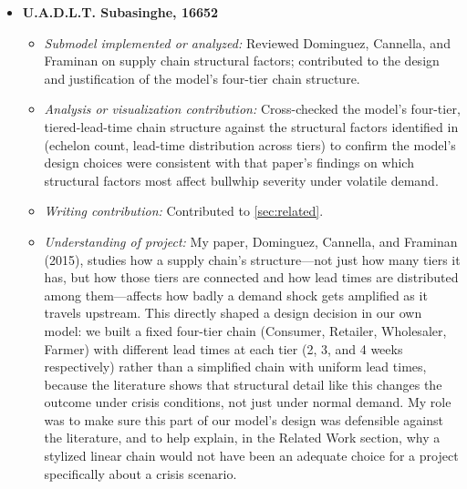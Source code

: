 \documentclass[final,onefignum,onetabnum]{siuro250211}
\begin{document}
\begin{itemize}[leftmargin=.3in]
\item[] \textbf{U.A.D.L.T. Subasinghe, 16652}
\begin{itemize}
\item \textit{Submodel implemented or analyzed:} Reviewed Dominguez, Cannella, and Framinan
\cite{DominguezCannellaFraminan2015} on supply chain structural factors; contributed to the design
and justification of the model's four-tier chain structure.
\item \textit{Analysis or visualization contribution:} Cross-checked the model's four-tier,
tiered-lead-time chain structure against the structural factors identified in
\cite{DominguezCannellaFraminan2015} (echelon count, lead-time distribution across tiers) to
confirm the model's design choices were consistent with that paper's findings on which structural
factors most affect bullwhip severity under volatile demand.
\item \textit{Writing contribution:} Contributed to \cref{sec:related}.
\item \textit{Understanding of project:} My paper, Dominguez, Cannella, and Framinan (2015),
studies how a supply chain's structure---not just how many tiers it has, but how those tiers are
connected and how lead times are distributed among them---affects how badly a demand shock gets
amplified as it travels upstream. This directly shaped a design decision in our own model: we
built a fixed four-tier chain (Consumer, Retailer, Wholesaler, Farmer) with different lead times
at each tier (2, 3, and 4 weeks respectively) rather than a simplified chain with uniform lead
times, because the literature shows that structural detail like this changes the outcome under
crisis conditions, not just under normal demand. My role was to make sure this part of our model's
design was defensible against the literature, and to help explain, in the Related Work section,
why a stylized linear chain would not have been an adequate choice for a project specifically
about a crisis scenario.
\end{itemize}


\end{itemize}
\end{document}
